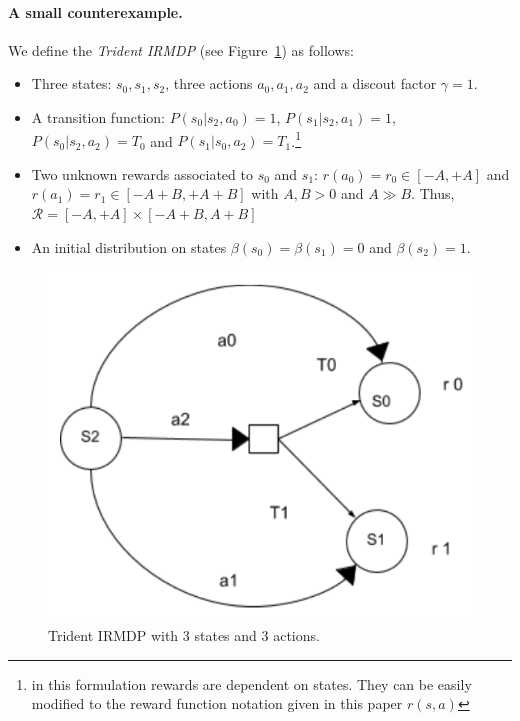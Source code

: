 \paragraph{\textbf{A small counterexample.}}%

We define the \textit{Trident IRMDP} (see Figure~\ref{fig:trident}) as follows:
\begin{itemize}
\item Three states: $s_0, s_1, s_2$, three actions $a_0, a_1, a_2$ and a discout factor $\gamma=1$.
\item A transition function: $P(s_0 | s_2,a_0)=1$, $P(s_1 |s_2 ,a_1)=1$, $P(s_0 | s_2, a_2) = T_0$ and $P(s_1 | s_0, a_2) = T_1$.\footnote{in this formulation rewards are dependent on states. They can be easily modified to the reward function notation given in this paper $r(s, a)$} 	 
\item Two unknown rewards associated to $s_0$ and $s_1$: $r(a_0)= r_0 \in [-A,+A]$ and $r(a_1)= r_1 \in [-A+B,+A+B]$ with $A,B > 0$ and $A \gg B$. Thus, $\mathcal{R} = [-A, +A]\times[-A+B, A+B]$
\item An initial distribution on states $\beta(s_0)= \beta(s_1) = 0$ and $\beta(s_2)=1$.

\end{itemize} 

\begin{figure}[]
	\begin{center}
    \includegraphics[scale=0.4]{images/Trident_MDP.pdf}
	\end{center}
	\caption{Trident IRMDP with $3$ states and $3$ actions.}
	\label{fig:trident} 
\end{figure}

